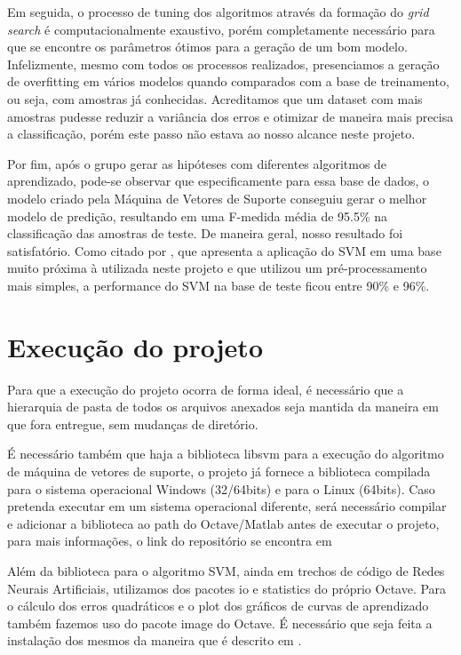 \documentclass[10pt, conference, compsocconf]{IEEEtran}
\begin{document}
    Em seguida, o processo de tuning dos algoritmos através da formação do \textit{grid search} é computacionalmente exaustivo, porém completamente necessário para que se encontre os parâmetros ótimos para a geração de um bom modelo. Infelizmente, mesmo com todos os processos realizados, presenciamos a geração de overfitting em vários modelos quando comparados com a base de treinamento, ou seja, com amostras já conhecidas. Acreditamos que um dataset com mais amostras pudesse reduzir a variância dos erros e otimizar de maneira mais precisa a classificação, porém este passo não estava ao nosso alcance neste projeto.
    
    Por fim, após o grupo gerar as hipóteses com diferentes algoritmos de
aprendizado, pode-se observar que especificamente para essa base de dados, o
modelo criado pela Máquina de Vetores de Suporte conseguiu gerar o melhor modelo
de predição, resultando em uma F-medida média de 95.5\% na classificação das
amostras de teste. De maneira geral, nosso resultado foi satisfatório. Como
citado por \cite{guia_svm}, que apresenta a aplicação do SVM em uma base muito próxima à utilizada neste projeto e que utilizou um pré-processamento mais simples, a performance do SVM na base de teste ficou entre 90\% e 96\%.


\printbibliography


\appendix
\section{Execução do projeto}\label{apendice_execucao}
Para que a execução do projeto ocorra de forma ideal, é necessário que a 
hierarquia de pasta de todos os arquivos anexados seja mantida da maneira em que fora 
entregue, sem mudanças de diretório.

É necessário também que haja a biblioteca libsvm para a execução do algoritmo 
de máquina de vetores de suporte, o projeto já fornece a biblioteca compilada 
para o sistema operacional Windows (32/64bits) e para o Linux (64bits). 
Caso pretenda executar em um sistema operacional diferente, será necessário 
compilar e adicionar a biblioteca ao path do Octave/Matlab antes de executar o 
projeto, para mais informações, o link do repositório se encontra em
\cite{libsvm}

Além da biblioteca para o algoritmo SVM, ainda em trechos de código de Redes 
Neurais Artificiais, utilizamos dos pacotes io e statistics do próprio Octave. 
Para o cálculo dos erros quadráticos e o plot dos gráficos de curvas de 
aprendizado também fazemos uso do pacote image do Octave. É necessário que 
seja feita a instalação dos mesmos da maneira que é descrito em
\cite{octave:install_remove}. 
\end{document}
